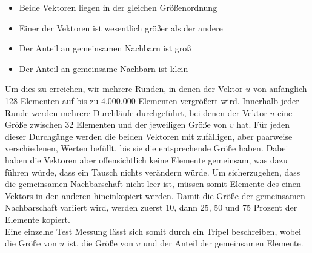 \begin{itemize}
	\item Beide Vektoren liegen in der gleichen Größenordnung
	
	\item Einer der Vektoren ist wesentlich größer als der andere
	
	\item Der Anteil an gemeinsamen Nachbarn ist groß
	
	\item Der Anteil an gemeinsame Nachbarn  ist klein
\end{itemize}
Um dies zu erreichen,  wir mehrere Runden, in denen der Vektor $u$ von anfänglich 128
Elementen auf bis zu 4.000.000 Elementen vergrößert wird. Innerhalb jeder Runde werden mehrere Durchläufe 
durchgeführt, bei denen der Vektor $u$ eine Größe zwischen 32 Elementen und der jeweiligen Größe von $v$ hat.
Für jeden dieser Durchgänge werden die beiden Vektoren mit zufälligen, aber paarweise verschiedenen,
Werten befüllt, bis sie die entsprechende Größe haben. 
Dabei haben die Vektoren aber offensichtlich keine Elemente gemeinsam, was dazu führen würde, dass ein \gc{} 
Tausch nichts verändern würde. Um sicherzugehen,
dass die gemeinsamen Nachbarschaft nicht leer ist, müssen somit Elemente des einen Vektors 
in den anderen hineinkopiert werden. Damit die Größe der gemeinsamen Nachbarschaft
variiert wird, werden zuerst 10, dann 25, 50 und 75 Prozent der Elemente kopiert. 
\\
Eine einzelne Test Messung lässt sich somit durch ein Tripel \fett{(\la, \sm, \fr)} beschreiben, wobei
\fett{\la} die Größe von $u$ ist, \fett{\sm} die Größe von $v$ und \fett{\fr} der Anteil der gemeinsamen Elemente.






